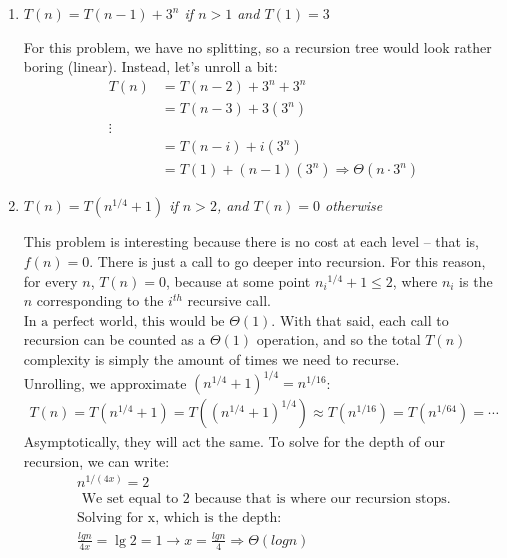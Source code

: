 \documentclass[12pt]{article}
\begin{document}
\begin{enumerate}
\begin{enumerate}
          \item \textit{$T(n)=T(n-1)+3^n$ if $n>1$ and $T(1)=3$}

          For this problem, we have no splitting, so a recursion tree would look rather boring (linear). Instead, let's unroll a bit:
          \begin{align*}
          T(n)&= T(n-2) + 3^n + 3^n\\
          &= T(n-3) + 3(3^n)\\
          \vdots\\
          &= T(n- i) + i(3^n)\\
          &= T(1) + (n-1)(3^n) \Longrightarrow \boxed{ \Theta(n \cdot 3^n)}
          \end{align*}

          \item \textit{$T(n)=T(n^{1/4}+1)$ if $n>2$, and $T(n)=0$ otherwise}

          This problem is interesting because there is no cost at each level -- that is, $f(n) = 0$. There is just a call to go deeper into recursion. For this reason, for every $n$, $T(n) = 0$, because at some point ${n_i}^{1/4} +1 \leq 2$, where $n_i$ is the $n$ corresponding to the $i^{th}$ recursive call. $\boxed{\text{In a perfect world, this would be } \Theta(1)}$.
      	  With that said, each call to recursion can be counted as a $\Theta(1)$ operation, and so the total $T(n)$ complexity is simply the amount of times we need to recurse.\\
      	  Unrolling, we approximate $(n^{1/4} + 1)^{1/4} = n^{1/16}$:
      	  \begin{gather*}
      	  T(n) = T(n^{1/4} + 1) = T((n^{1/4}+1)^{1/4}) \approx T(n^{1/16}) = T(n^{1/64})  = \cdots
      	  \end{gather*}
      	  Asymptotically, they will act the same. To solve for the depth of our recursion, we can write:
      	  \begin{gather*}
      	  n^{1/(4x)} = 2\\ \text{    We set equal to 2 because that is where our recursion stops.}\\
      	  \text{Solving for x, which is the depth:}\\
      	  \frac{lgn}{4x} = \lg 2 = 1 \rightarrow x = \frac{lgn}{4} \Longrightarrow \boxed{\Theta(logn)}
      	  \end{gather*}
	
	\end{enumerate}
	

\end{enumerate}
\end{document}
